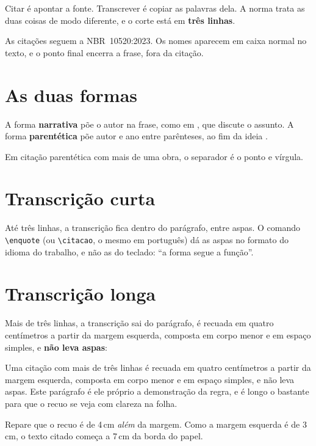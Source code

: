 \documentclass[dsc]{ufrj}
\begin{document}
  Citar é apontar a fonte. Transcrever é copiar as palavras dela. A norma trata
  as duas coisas de modo diferente, e o corte está em \textbf{três linhas}.

  As citações seguem a \mbox{NBR~10520:2023}. Os nomes aparecem em caixa normal
  no texto, e o ponto final encerra a frase, fora da citação.

  \section{As duas formas}

  A forma \textbf{narrativa} põe o autor na frase, como em
  \citet{article-example}, que discute o assunto. A forma \textbf{parentética}
  põe autor e ano entre parênteses, ao fim da ideia \citep{book-example}.

  Em citação parentética com mais de uma obra, o separador é o ponto e vírgula.

  \section{Transcrição curta}

  Até três linhas, a transcrição fica dentro do parágrafo, entre aspas. O comando
  \verb|\enquote| (ou \verb|\citacao|, o mesmo em português) dá as aspas no
  formato do idioma do trabalho, e não as do teclado: \enquote{a forma segue a
  função}.

  \section{Transcrição longa}

  Mais de três linhas, a transcrição sai do parágrafo, é recuada em quatro
  centímetros a partir da margem esquerda, composta em corpo menor e em espaço
  simples, e \textbf{não leva aspas}:

  \begin{longquote}
    Uma citação com mais de três linhas é recuada em quatro centímetros a partir
    da margem esquerda, composta em corpo menor e em espaço simples, e não leva
    aspas. Este parágrafo é ele próprio a demonstração da regra, e é longo o
    bastante para que o recuo se veja com clareza na folha.
  \end{longquote}

  Repare que o recuo é de 4\,cm \emph{além} da margem. Como a margem esquerda é
  de 3\,cm, o texto citado começa a 7\,cm da borda do papel.
\end{document}
